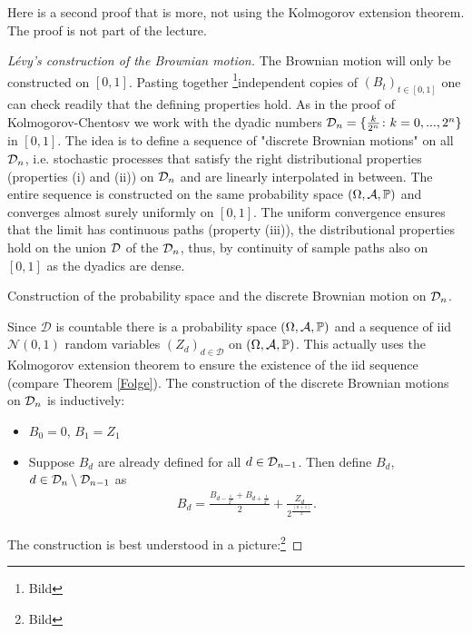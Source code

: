 Here is a second proof that is more, not using the Kolmogorov extension theorem. The proof is not part of the lecture.
\begin{proof}[L\'evy's construction of the Brownian motion]
	The Brownian motion will only be constructed on $[0,1]$. Pasting together \footnote{Bild}independent copies of $(B_t)_{t\in [0,1]}$  one can check readily that the defining properties hold. As in the proof of Kolmogorov-Chentosv we work with the dyadic numbers $\cD_n = \{ \frac{k}{2^n}\colon k=0,...,2^n\}$ in $[0,1]$. The idea is to define a sequence of "discrete Brownian motions"{} on all $\cD_n$, i.e. stochastic processes that satisfy the right distributional properties (properties (i) and (ii)) on $\cD_n$ and are linearly interpolated in between. The entire sequence is constructed on the same probability space $(\Omega, \mathcal A, \P)$ and converges almost surely uniformly on $[0,1]$. The uniform convergence ensures that the limit has continuous paths (property (iii)), the distributional properties hold on the union $\cD$ of the $\cD_n$, thus, by continuity of sample paths also on $[0,1]$ as the dyadics are dense.
	\begin{lstep}
		Construction of the probability space and the discrete Brownian motion on $\cD_n$.
	\end{lstep}
	Since $\mathcal D$ is countable there is a probability space $(\Omega, \mathcal A, \P)$ and a sequence of iid $\mathcal N(0,1)$ random variables $(Z_d)_{d\in \mathcal D}$ on $(\Omega, \mathcal A, \P)$. This actually uses the Kolmogorov extension theorem to ensure the existence of the iid sequence (compare Theorem \ref{Folge}). The construction of the discrete Brownian motions on $\cD_n$ is inductively: 
	\begin{itemize}
		\item $B_0 = 0$, $B_1 = Z_1$
		\item Suppose $B_d$ are already defined for all $d\in \cD_{n-1}$. Then define $B_d$, $d\in \cD_n \setminus \cD_{n-1}$ as
		\begin{align*}
			B_d = \frac{B_{d-\frac{1}{2^n}} +B_{d+\frac{1}{2^n}}}{2} + \frac{Z_d}{2^{\frac{(n+1)}{2}}}.
		\end{align*}
	\end{itemize}
	The construction is best understood in a picture:\footnote{Bild}


\end{proof}
